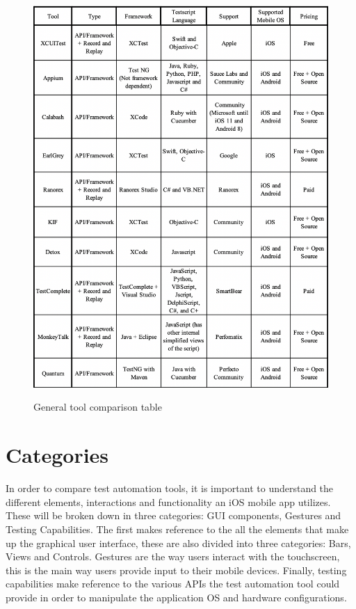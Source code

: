 \begin{figure}[h!]
	\centering
	\includegraphics[width=12cm]{img/table1.png} \\[0mm]
	\vspace{0cm}
	\caption{General tool comparison table}
	\label{Toolcomparison}
\end{figure} 

\section{Categories}
In order to compare test automation tools, it is important to understand the different elements, interactions and functionality an iOS mobile app utilizes. These will be broken down in three categories: GUI components, Gestures and Testing Capabilities. The first makes reference to the all the elements that make up the graphical user interface, these are also divided into three categories: Bars, Views and Controls. Gestures are the way users interact with the touchscreen, this is the main way users provide input to their mobile devices. Finally, testing capabilities make reference to the various APIs the test automation tool could provide in order to manipulate the application OS and hardware configurations.

